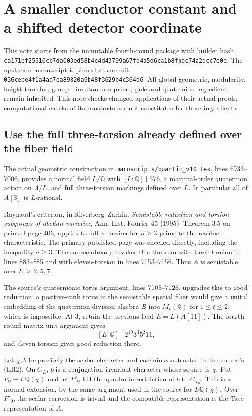 \section{A smaller conductor constant and a shifted detector coordinate}

This note starts from the immutable fourth-round package with builder hash
\texttt{ca171bf25610cb7da003ed58b4c4d43799a67fd4b5d6ca1b8fbac74a2dcc7e0e}.
The upstream manuscript is pinned at commit
\texttt{036cebe4f1a4aa7ca89820a9b48f3629b4c364d6}.
All global geometric, modularity, height-transfer, group, simultaneous-prime,
pole and quaternion ingredients remain inherited. This note checks changed
applications of their actual proofs; computational checks of its constants
are not substitutes for those ingredients.

\subsection{Use the full three-torsion already defined over the fiber field}

The actual geometric construction in
\texttt{manuscripts/quartic\_v10.tex}, lines 6933--7006, provides a
normal field $L/\mathbb Q$ with $[L:\mathbb Q]\mid576$, a maximal-order
quaternion action on $A/L$, and full three-torsion markings defined over
$L$. In particular all of $A[3]$ is $L$-rational.

Raynaud's criterion, in Silverberg--Zarhin, \emph{Semistable reduction
and torsion subgroups of abelian varieties}, Ann. Inst. Fourier 45 (1995),
Theorem 3.5 on printed page 406, applies to full $n$-torsion for $n\ge3$
prime to the residue characteristic. The primary published page was
checked directly, including the inequality $n\ge3$.
The source already invokes this theorem with three-torsion in lines
883--885 and with eleven-torsion in lines 7153--7156.
Thus $A$ is semistable over $L$ at $2,5,7$.

The source's quaternionic torus argument, lines 7105--7126, upgrades
this to good reduction: a positive-rank torus in the semistable special
fiber would give a unital embedding of the quaternion division algebra
$B$ into $M_t(\mathbb Q)$ for $1\le t\le2$, which is impossible.
At $3$, retain the previous field $E=L(A[11])$. The fourth-round
matrix-unit argument gives
\[
 [E:\mathbb Q]\mid2^{10}3^3 5^2 11,
\]
and eleven-torsion gives good reduction there.

Let $\chi,b$ be precisely the scalar character and cochain constructed
in the source's (LR2). On $G_L$, $b$ is a conjugation-invariant character
whose square is $\chi$. Put $F_0=L\mathbb Q(\chi)$ and let $F'_0$
kill the quadratic restriction of $b$ to $G_{F_0}$. This is a normal
extension, by the same argument used in the source for $E\mathbb Q(\chi)$.
Over $F'_0$, the scalar correction is trivial and the compatible
representation is the Tate representation of $A$.

